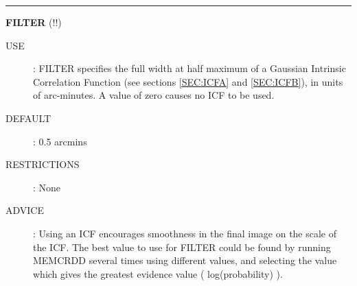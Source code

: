 \rule{\textwidth}{0.3mm}
{\Large {\bf FILTER} (!!)}
\begin{description}
\item [USE]:
FILTER specifies the full width at half maximum of a Gaussian Intrinsic 
Correlation Function (see sections \ref {SEC:ICFA} and \ref {SEC:ICFB}), in 
units of arc-minutes. A value of zero causes no ICF to be used.
\item [DEFAULT]:
0.5 arcmins
\item [RESTRICTIONS]:
None
\item [ADVICE]:
Using an ICF encourages smoothness in the final image on the scale of the ICF. 
The best value to use for FILTER could be found by running MEMCRDD several times 
using different values, and selecting the value which gives the greatest 
evidence value ( log(probability) ).
\end {description}

